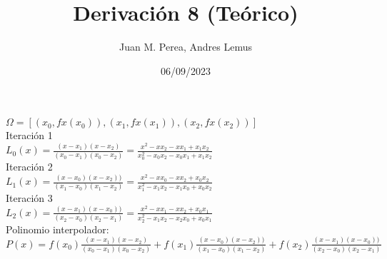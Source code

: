 \documentclass{article}
\title{Derivación 8 (Teórico)}
\author{Juan M. Perea, Andres Lemus}
\date{06/09/2023}
\begin{document}
\maketitle

$\Omega=[(x_0,fx(x_0)),(x_1,fx(x_1)),(x_2,fx(x_2))]$\\
Iteración 1\\
$L_0(x)=\frac{(x-x_1)(x-x_2)}{(x_0-x_1)(x_0-x_2)}=\frac{x^2-xx_2-xx_1+x_1x_2}{x^2_0-x_0x_2-x_0x_1+x_1x_2}$\\
Iteración 2\\
$L_1(x)=\frac{(x-x_0)(x-x_2))}{(x_1-x_0)(x_1-x_2)}=\frac{x^{2}-xx_0-xx_2+x_0x_2}{x_1^{2}-x_1x_2-x_1x_0+x_0x_2}$\\
Iteración 3\\
$L_2(x)=\frac{(x-x_1)(x-x_0))}{(x_2-x_0)(x_2-x_1)}=\frac{x^{2}-xx_1-xx_2+x_0x_1}{x_2^{2}-x_1x_2-x_2x_0+x_0x_1}$\\
Polinomio interpolador:\\
$P(x)=f(x_0)\frac{(x-x_1)(x-x_2)}{(x_0-x_1)(x_0-x_2)}+f(x_1)\frac{(x-x_0)(x-x_2))}{(x_1-x_0)(x_1-x_2)}+f(x_2)\frac{(x-x_1)(x-x_0))}{(x_2-x_0)(x_2-x_1)}$
\end{document}
